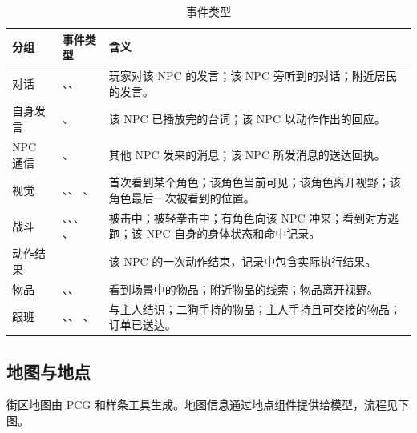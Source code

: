 \documentclass[11pt]{article}
\begin{document}
\begin{table}[H]
\small
\begin{tabularx}{\textwidth}{@{}l >{\raggedright\arraybackslash}p{6.3cm} L@{}}
\toprule
\textbf{分组} & \textbf{事件类型} & \textbf{含义} \\
\midrule
对话 & 、、 & 玩家对该 NPC 的发言；该 NPC 旁听到的对话；附近居民的发言。 \\
自身发言 & 、 & 该 NPC 已播放完的台词；该 NPC 以动作作出的回应。 \\
NPC 通信 & 、 & 其他 NPC 发来的消息；该 NPC 所发消息的送达回执。 \\
视觉 & 、、 、 & 首次看到某个角色；该角色当前可见；该角色离开视野；该角色最后一次被看到的位置。 \\
战斗 & 、、、 、 & 被击中；被轻拳击中；有角色向该 NPC 冲来；看到对方逃跑；该 NPC 自身的身体状态和命中记录。 \\
动作结果 &  & 该 NPC 的一次动作结束，记录中包含实际执行结果。 \\
物品 & 、、  & 看到场景中的物品；附近物品的线索；物品离开视野。 \\
跟班 & 、、 、  & 与主人结识；二狗手持的物品；主人手持且可交接的物品；订单已送达。 \\
\bottomrule
\end{tabularx}
\caption{事件类型}
\end{table}

\subsection{地图与地点}

街区地图由 PCG 和样条工具生成。地图信息通过地点组件提供给模型，流程见下图。
\end{document}
